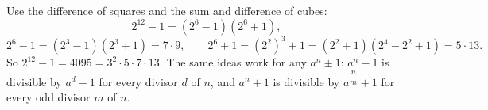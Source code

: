 Use the difference of squares and the sum and difference of cubes:
\[
2^{12}-1=\left(2^6-1\right)\left(2^6+1\right),
\]
\[
2^6-1=\left(2^3-1\right)\left(2^3+1\right)=7\cdot9,\qquad 2^6+1=\left(2^2\right)^3+1=\left(2^2+1\right)\left(2^4-2^2+1\right)=5\cdot13 .
\]
So $2^{12}-1=4095=\boxed{3^2\cdot5\cdot7\cdot13}$. The same ideas work for any $a^n\pm1$: $a^n-1$ is divisible by $a^d-1$ for every divisor $d$ of $n$, and $a^n+1$ is divisible by $a^{\dfrac {n}{m}}+1$ for every odd divisor $m$ of $n$.
